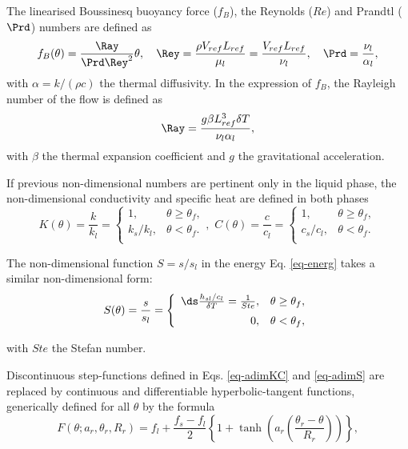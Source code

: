\noindent The linearised Boussinesq buoyancy force ($f_B$), the Reynolds ($Re$) and Prandtl ($\Prd$) numbers are defined as
\begin{equation}\label{eq-RePr}
f_B(\theta) = \frac{\Ray}{\Prd \Rey^2} \theta, \quad \Rey = \frac{\rho V_{ref} L_{ref}}{\mu_l}=  \frac{V_{ref} L_{ref}}{\nu_l} , \quad \Prd = \frac{\nu_l}{\alpha_l},
\end{equation}
with $\alpha = k/(\rho c)$  the thermal diffusivity. In the expression of $f_B$, the Rayleigh number of the flow is defined as
\begin{equation}
\label{eq-Rayleigh}
\Ray = \frac{g \beta L_{ref}^3 \delta T}{\nu_l \alpha_l},
\end{equation}
with $\beta$ the thermal expansion coefficient and $g$ the gravitational acceleration.

\noindent If previous non-dimensional numbers are pertinent only in the liquid phase, the non-dimensional conductivity and specific heat are  defined in both phases
\begin{equation}\label{eq-adimKC}
K(\theta)= \frac{k}{k_l} =\left\{
\begin{matrix}
1, & \theta \geq \theta_f ,\\
k_s/k_l, & \theta < \theta_f .\\
\end{matrix}
\right.
, \,  \, C(\theta) = \frac{c}{c_l}=\left\{
\begin{matrix}
1, & \theta \geq \theta_f ,\\
c_s/c_l, & \theta < \theta_f .\\
\end{matrix}
\right.
\end{equation}

\noindent The non-dimensional function $S = s/s_l$ in the energy Eq. \ref{eq-energ} takes a similar non-dimensional form:
\begin{equation}\label{eq-adimS}
S(\theta)= \frac{s}{s_l} =\left\{
\begin{array}{rl} \vspace{0.2cm}
\ds \frac{h_{sl}/c_l}{\delta T} = \frac{1}{Ste}, & \theta \geq \theta_f ,\\
0, & \theta < \theta_f,\\
\end{array}
\right.
\end{equation}

\noindent with $Ste$ the Stefan number.

\noindent Discontinuous step-functions defined in Eqs. \ref{eq-adimKC}  and \ref{eq-adimS} are replaced by continuous and differentiable hyperbolic-tangent functions, generically defined for all $\theta$ by the formula \citep{dan-2014-JCP}
\begin{equation}
F(\theta; a_r, \theta_r, R_r) = f_l + \frac{f_s-f_l}{2}\left\{
1 + \tanh\left( a_r \left(\frac{\theta_r-\theta}{R_r}\right)\right)
\right\},
\label{eq-smooth}
\end{equation}

